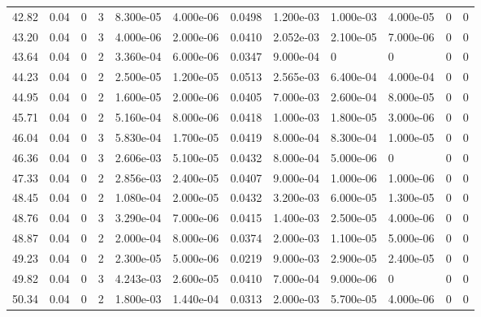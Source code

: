 \documentclass[preview]{standalone}
\begin{document}
{{{\begin{tabular}{L{1.2cm}C{1.2cm} C{0.3cm}C{0.5cm} C{1.4cm}C{1.4cm} C{1.4cm}C{1.4cm} C{1.6cm}C{1.6cm} C{1.6cm}C{1.6cm}}
  42.82  &  0.04  & 0     &  3 &  8.300e-05  & 4.000e-06  &  0.0498&   1.200e-03& 1.000e-03 & 4.000e-05   &  0 & 0  \\ 
  43.20  &  0.04  & 0     &  3 &  4.000e-06  & 2.000e-06  &  0.0410&   2.052e-03& 2.100e-05 & 7.000e-06   &  0 & 0  \\ 
  43.64  &  0.04  & 0     &  2 &  3.360e-04  & 6.000e-06  &  0.0347&   9.000e-04& 0 & 0   &  0 & 0  \\ 
  44.23  &  0.04  & 0     &  2 &  2.500e-05  & 1.200e-05  &  0.0513&   2.565e-03& 6.400e-04 & 4.000e-04   &  0 & 0  \\ 
  44.95  &  0.04  & 0     &  2 &  1.600e-05  & 2.000e-06  &  0.0405&   7.000e-03& 2.600e-04 & 8.000e-05   &  0 & 0  \\ 
  45.71  &  0.04  & 0     &  2 &  5.160e-04  & 8.000e-06  &  0.0418&   1.000e-03& 1.800e-05 & 3.000e-06   &  0 & 0  \\ 
  46.04  &  0.04  & 0     &  3 &  5.830e-04  & 1.700e-05  &  0.0419&   8.000e-04& 8.300e-04 & 1.000e-05   &  0 & 0  \\ 
  46.36  &  0.04  & 0     &  3 &  2.606e-03  & 5.100e-05  &  0.0432&   8.000e-04& 5.000e-06 & 0   &  0 & 0  \\ 
  47.33  &  0.04  & 0     &  2 &  2.856e-03  & 2.400e-05  &  0.0407&   9.000e-04& 1.000e-06 & 1.000e-06   &  0 & 0  \\ 
  48.45  &  0.04  & 0     &  2 &  1.080e-04  & 2.000e-05  &  0.0432&   3.200e-03& 6.000e-05 & 1.300e-05   &  0 & 0  \\ 
  48.76  &  0.04  & 0     &  3 &  3.290e-04  & 7.000e-06  &  0.0415&   1.400e-03& 2.500e-05 & 4.000e-06   &  0 & 0  \\ 
  48.87  &  0.04  & 0     &  2 &  2.000e-04  & 8.000e-06  &  0.0374&   2.000e-03& 1.100e-05 & 5.000e-06   &  0 & 0  \\ 
  49.23  &  0.04  & 0     &  2 &  2.300e-05  & 5.000e-06  &  0.0219&   9.000e-03& 2.900e-05 & 2.400e-05   &  0 & 0  \\ 
  49.82  &  0.04  & 0     &  3 &  4.243e-03  & 2.600e-05  &  0.0410&   7.000e-04& 9.000e-06 & 0   &  0 & 0  \\ 
  50.34  &  0.04  & 0     &  2 &  1.800e-03  & 1.440e-04  &  0.0313&   2.000e-03& 5.700e-05 & 4.000e-06   &  0 & 0  \\ 
\hline 
\end{tabular} 

}}}
\end{document}
